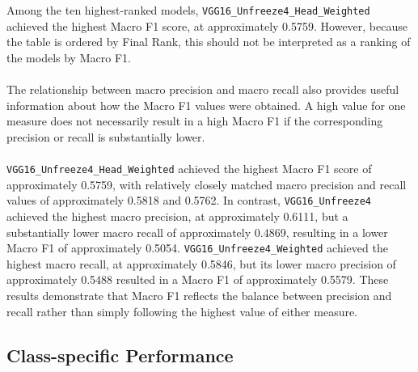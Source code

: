 \documentclass[12pt, a4paper]{report}
\let\oldsubsection\subsection
\renewcommand{\subsection}{%
    \Needspace{6\baselineskip}%
    \oldsubsection
}
\begin{document}
				Among the ten highest-ranked models, \texttt{VGG16\_Unfreeze4\_Head\_Weighted} achieved the highest Macro F1 score, at approximately 0.5759. However, because the table is ordered by Final Rank, this should not be interpreted as a ranking of the models by Macro F1.\\\\
				The relationship between macro precision and macro recall also provides useful information about how the Macro F1 values were obtained. A high value for one measure does not necessarily result in a high Macro F1 if the corresponding precision or recall is substantially lower.\\\\
				\texttt{VGG16\_Unfreeze4\_Head\_Weighted} achieved the highest Macro F1 score of approximately 0.5759, with relatively closely matched macro precision and recall values of approximately 0.5818 and 0.5762. In contrast, \texttt{VGG16\_Unfreeze4} achieved the highest macro precision, at approximately 0.6111, but a substantially lower macro recall of approximately 0.4869, resulting in a lower Macro F1 of approximately 0.5054. \texttt{VGG16\_Unfreeze4\_Weighted} achieved the highest macro recall, at approximately 0.5846, but its lower macro precision of approximately 0.5488 resulted in a Macro F1 of approximately 0.5579. These results demonstrate that Macro F1 reflects the balance between precision and recall rather than simply following the highest value of either measure.
				
			\subsection{Class-specific Performance}
				
\end{document}
